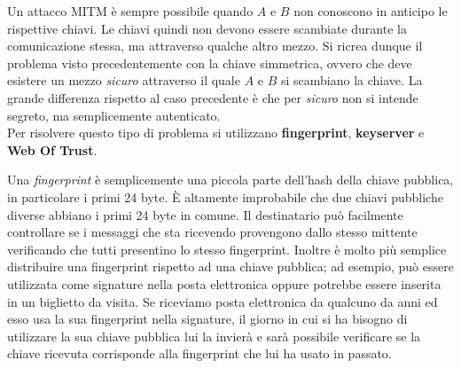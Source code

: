 Un attacco MITM è sempre possibile quando $A$ e $B$ non conoscono in anticipo le rispettive chiavi. Le chiavi quindi non devono essere scambiate durante la comunicazione stessa, ma attraverso qualche altro mezzo. Si ricrea dunque il problema visto precedentemente con la chiave simmetrica, ovvero che deve esistere un mezzo \textit{sicuro} attraverso il quale $A$ e $B$ si scambiano la chiave. La grande differenza rispetto al caso precedente è che per \textit{sicuro} non si intende segreto, ma semplicemente autenticato.\\
Per risolvere questo tipo di problema si utilizzano \textbf{fingerprint}, \textbf{keyserver} e \textbf{Web Of Trust}.

Una \textit{fingerprint} è semplicemente una piccola parte dell'hash della chiave pubblica, in particolare i primi 24 byte. È altamente improbabile che due chiavi pubbliche diverse abbiano i primi 24 byte in comune. Il destinatario può facilmente controllare se i messaggi che sta ricevendo provengono dallo stesso mittente verificando che tutti presentino lo stesso fingerprint. Inoltre è molto più semplice distribuire una fingerprint rispetto ad una chiave pubblica; ad esempio, può essere utilizzata come signature nella posta elettronica oppure potrebbe essere inserita in un biglietto da visita. Se riceviamo posta elettronica da qualcuno da anni ed esso usa la sua fingerprint nella signature, il giorno in cui si ha bisogno di utilizzare la sua chiave pubblica lui la invierà e sarà possibile verificare se la chiave ricevuta corrisponde alla fingerprint che lui ha usato in passato.


